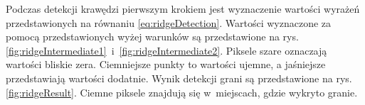 Podczas detekcji krawędzi pierwszym krokiem jest wyznaczenie wartości wyrażeń przedstawionych na równaniu \eqref{eq:ridgeDetection}. Wartości wyznaczone za pomocą przedstawionych wyżej warunków są przedstawione na rys. \ref{fig:ridgeIntermediate1}~i~\ref{fig:ridgeIntermediate2}. Piksele szare oznaczają wartości bliskie zera. Ciemniejsze punkty to wartości ujemne, a jaśniejsze przedstawiają wartości dodatnie. Wynik detekcji grani są przedstawione na rys. \ref{fig:ridgeResult}. Ciemne piksele znajdują się w~miejscach, gdzie wykryto granie.
